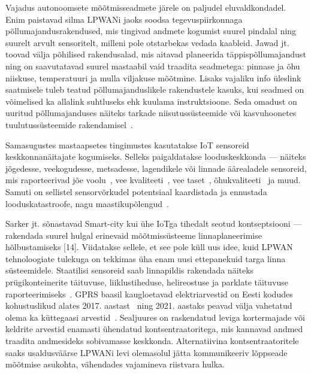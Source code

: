 \documentclass[12pt]{article}
\begin{document}
    Vajadus autonoomsete mõõtmisseadmete järele on paljudel eluvaldkondadel. Enim paistavad silma LPWANi jaoks soodsa tegevuspiirkonnaga põllumajandusrakendused, mis tingivad andmete kogumist suurel pindalal ning suurelt arvult sensoritelt, milleni pole otstarbekas vedada kaableid.
    Jawad jt.~\cite{jawad2017energy} toovad välja põhilised rakendusalad, mis aitavad planeerida täppispõllumajandust ning on saavutatavad suurel mastaabil vaid traadita seadmetega: pinnase ja õhu niiskuse, temperatuuri ja mulla viljakuse mõõtmine.
    Lisaks vajaliku info üleslink saatmisele tuleb teatud põllumajanduslikele rakendustele kasuks, kui seadmed on võimelised ka allalink suhtluseks ehk kuulama instruktsioone.
    Seda omadust on uuritud põllumajanduses näiteks tarkade niisutussüsteemide või kasvuhoonetes tuulutussüsteemide rakendamisel~\cite{abba2019design}.

    Samasugustes mastaapsetes tingimustes kasutatakse IoT sensoreid keskkonnanäitajate kogumiseks.
    Selleks paigaldatakse looduskeskkonda — näiteks jõgedesse, veekogudesse, metsadesse, lagendikele või linnade äärealadele sensoreid, mis raporteerivad jõe voolu~\cite{guibene2017evaluation}, vee kvaliteeti~\cite{liu2018solar}, vee taset~\cite{moreno2019rivercore}, õhukvaliteeti~\cite{knoll2018low} ja muud.
    Samuti on sellistel sensorvõrkudel potentsiaal kaardistada ja ennustada looduskatastroofe, nagu maastikupõlengud~\cite{kang}.

    Sarker jt. sõnastavad Smart-city kui ühe IoTga tihedalt seotud kontseptsiooni — rakendada suurel hulgal erinevaid mõõtmissüsteeme linnaplaneerimise hõlbustamiseks [14].
    Viidatakse sellele, et see pole küll uus idee, kuid LPWAN tehnoloogiate tulekuga on tekkimas üha enam uusi ettepanekuid targa linna süsteemidele.
    Staatilisi sensoreid saab linnapildis rakendada näiteks prügikonteinerite täituvuse, liiklustiheduse, helireostuse ja parklate täituvuse raporteerimiseks~\cite{zanella}.
    GPRS baasil kaugloetavad elektriarvestid on Eesti kodudes kohustuslikud alates 2017. aastast~\cite{laurit} ning 2021. aastaks peavad välja vahetatud olema ka küttegaasi arvestid~\cite{gaas}.
    Sealjuures on raskendatud leviga kortermajade või keldrite arvestid enamasti ühendatud kontsentraatoritega, mis kannavad andmed traadita andmesideks sobivamasse keskkonda.
    Alternatiivina kontsentraatoritele saaks usaldusväärse LPWANi levi olemasolul jätta kommunikeeriv lõppseade mõõtmise asukohta, vähendades vajamineva riistvara hulka.
\end{document}
